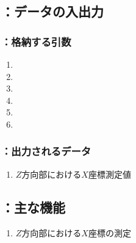 \subsection{\MXOface：データの入出力}

\subsubsection{\MXOface：格納する引数}
\begin{enumerate}[label*=\sarrow]
\item \PMACOD
\item \PMKeywayACOD
\item \PMTopReAlocationLength
\item \PMKeywayWidth
\item \PMKeywayPos
\item \PMAsideKeywayDepth
\end{enumerate}

\subsubsection{\MXOface：出力されるデータ}
\begin{enumerate}[label*=\sarrow]
\item $Z$方向\KeywayCenter 部における\KeywayCenter$X$座標測定値
\end{enumerate}



\subsection{\MXOface：主な機能}
\begin{enumerate}[label*=\sarrow]
\item $Z$方向\KeywayCenter 部における\KeywayCenter$X$座標の測定
\end{enumerate}



